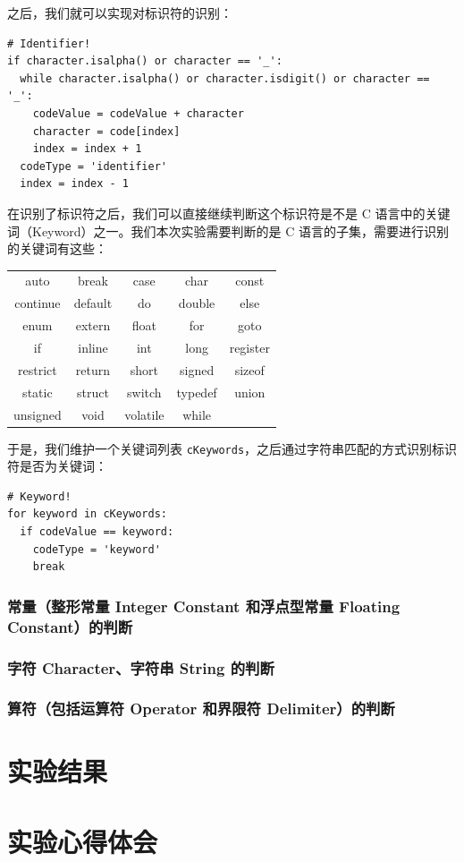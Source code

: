 \documentclass[UTF8]{ctexart}
\begin{document}
之后，我们就可以实现对标识符的识别：

\begin{verbatim}
# Identifier!
if character.isalpha() or character == '_':
  while character.isalpha() or character.isdigit() or character == '_':
    codeValue = codeValue + character
    character = code[index]
    index = index + 1
  codeType = 'identifier'
  index = index - 1
\end{verbatim}

在识别了标识符之后，我们可以直接继续判断这个标识符是不是 C 语言中的关键词（Keyword）之一。我们本次实验需要判断的是 C 语言的子集，需要进行识别的关键词有这些：

\begin{center}
  \begin{tabular}{c|c|c|c|c}
    \hline
    auto & break & case & char & const \\
    continue & default & do & double & else \\
    enum & extern & float & for & goto \\
    if & inline & int & long & register \\
    restrict & return & short & signed & sizeof \\
    static & struct & switch & typedef & union \\
    unsigned & void & volatile & while \\
    \hline
  \end{tabular}
\end{center}

于是，我们维护一个关键词列表 \texttt{cKeywords}，之后通过字符串匹配的方式识别标识符是否为关键词：

\begin{verbatim}
# Keyword!
for keyword in cKeywords:
  if codeValue == keyword:
    codeType = 'keyword'
    break
\end{verbatim}

\subsubsection{常量（整形常量 Integer Constant 和浮点型常量 Floating Constant）的判断}

\subsubsection{字符 Character、字符串 String 的判断}

\subsubsection{算符（包括运算符 Operator 和界限符 Delimiter）的判断}

\section{实验结果}

\section{实验心得体会}
\end{document}
